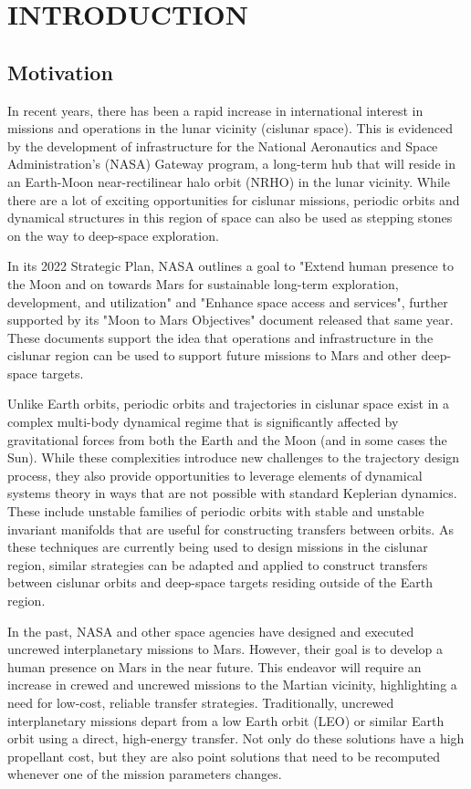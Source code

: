 \chapter{INTRODUCTION}
\section{Motivation}
In recent years, there has been a rapid increase in international interest in missions and
operations in the lunar vicinity (cislunar space). This is evidenced by the development of
infrastructure for the National Aeronautics and Space Administration's (NASA) Gateway program, a
long-term hub that will reside in an Earth-Moon near-rectilinear halo orbit (NRHO) in the lunar
vicinity\cite{Zamora:2024}. While there are a lot of exciting opportunities for cislunar missions,
periodic orbits and dynamical structures in this region of space can also be used as stepping
stones on the way to deep-space exploration.

In its 2022 Strategic Plan, NASA outlines a goal to "Extend human presence to the Moon and on
towards Mars for sustainable long-term exploration, development, and utilization" and "Enhance
space access and services"\cite{NASA:2022s}, further supported by its "Moon to Mars
Objectives" document released that same year\cite{NASA:2022m}. These documents support the idea
that operations and infrastructure in the cislunar region can be used to support future missions to
Mars and other deep-space targets.

Unlike Earth orbits, periodic orbits and trajectories in cislunar space exist in a complex
multi-body dynamical regime that is significantly affected by gravitational forces from both the
Earth and the Moon (and in some cases the Sun). While these complexities introduce new challenges
to the trajectory design process, they also provide opportunities to leverage elements of dynamical
systems theory in ways that are not possible with standard Keplerian dynamics. These include
unstable families of periodic orbits with stable and unstable invariant manifolds that are useful
for constructing transfers between orbits. As these techniques are currently being used to design
missions in the cislunar region, similar strategies can be adapted and applied to construct
transfers between cislunar orbits and deep-space targets residing outside of the Earth region.

In the past, NASA and other space agencies have designed and executed uncrewed interplanetary
missions to Mars. However, their goal is to develop a human presence on Mars in the near future.
This endeavor will require an increase in crewed and uncrewed missions to the Martian vicinity,
highlighting a need for low-cost, reliable transfer strategies. Traditionally, uncrewed
interplanetary missions depart from a low Earth orbit (LEO) or similar Earth orbit using a direct,
high-energy transfer\cite{Drake:2009}. Not only do these solutions have a high propellant cost, but
they are also point solutions that need to be recomputed whenever one of the mission parameters
changes.


